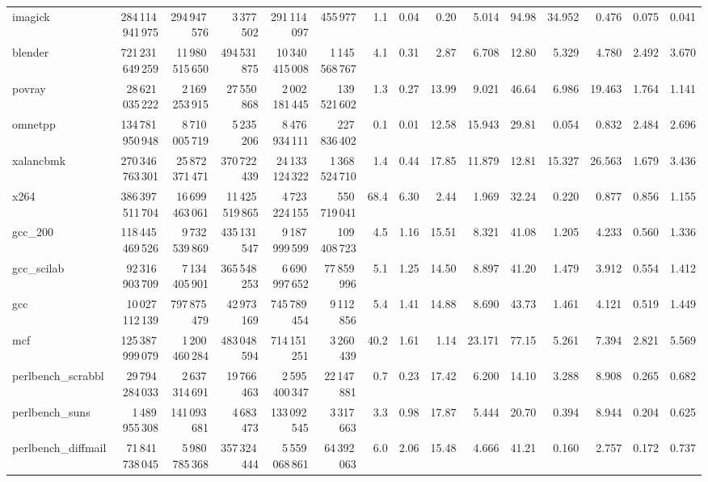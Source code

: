 \documentclass[9pt,landscape,a4paper]{article}
\begin{document}
\begin{adjustbox}{max width=\textwidth, max totalheight=0.50\textheight}
\begin{tabular}{lrrrrrrrrrrrrrr}
imagick & 284\,114\,941\,975 & 294\,947\,576 & 3\,377\,502 & 291\,114\,097 & 455\,977 & 1.1 & 0.04 & 0.20 & 5.014 & 94.98 & 34.952 & 0.476 & 0.075 & 0.041 \\
blender & 721\,231\,649\,259 & 11\,980\,515\,650 & 494\,531\,875 & 10\,340\,415\,008 & 1\,145\,568\,767 & 4.1 & 0.31 & 2.87 & 6.708 & 12.80 & 5.329 & 4.780 & 2.492 & 3.670 \\
povray & 28\,621\,035\,222 & 2\,169\,253\,915 & 27\,550\,868 & 2\,002\,181\,445 & 139\,521\,602 & 1.3 & 0.27 & 13.99 & 9.021 & 46.64 & 6.986 & 19.463 & 1.764 & 1.141 \\
omnetpp & 134\,781\,950\,948 & 8\,710\,005\,719 & 5\,235\,206 & 8\,476\,934\,111 & 227\,836\,402 & 0.1 & 0.01 & 12.58 & 15.943 & 29.81 & 0.054 & 0.832 & 2.484 & 2.696 \\
xalancbmk & 270\,346\,763\,301 & 25\,872\,371\,471 & 370\,722\,439 & 24\,133\,124\,322 & 1\,368\,524\,710 & 1.4 & 0.44 & 17.85 & 11.879 & 12.81 & 15.327 & 26.563 & 1.679 & 3.436 \\
x264 & 386\,397\,511\,704 & 16\,699\,463\,061 & 11\,425\,519\,865 & 4\,723\,224\,155 & 550\,719\,041 & 68.4 & 6.30 & 2.44 & 1.969 & 32.24 & 0.220 & 0.877 & 0.856 & 1.155 \\
gcc\_200 & 118\,445\,469\,526 & 9\,732\,539\,869 & 435\,131\,547 & 9\,187\,999\,599 & 109\,408\,723 & 4.5 & 1.16 & 15.51 & 8.321 & 41.08 & 1.205 & 4.233 & 0.560 & 1.336 \\
gcc\_scilab & 92\,316\,903\,709 & 7\,134\,405\,901 & 365\,548\,253 & 6\,690\,997\,652 & 77\,859\,996 & 5.1 & 1.25 & 14.50 & 8.897 & 41.20 & 1.479 & 3.912 & 0.554 & 1.412 \\
gcc & 10\,027\,112\,139 & 797\,875\,479 & 42\,973\,169 & 745\,789\,454 & 9\,112\,856 & 5.4 & 1.41 & 14.88 & 8.690 & 43.73 & 1.461 & 4.121 & 0.519 & 1.449 \\
mcf & 125\,387\,999\,079 & 1\,200\,460\,284 & 483\,048\,594 & 714\,151\,251 & 3\,260\,439 & 40.2 & 1.61 & 1.14 & 23.171 & 77.15 & 5.261 & 7.394 & 2.821 & 5.569 \\
perlbench\_scrabbl & 29\,794\,284\,033 & 2\,637\,314\,691 & 19\,766\,463 & 2\,595\,400\,347 & 22\,147\,881 & 0.7 & 0.23 & 17.42 & 6.200 & 14.10 & 3.288 & 8.908 & 0.265 & 0.682 \\
perlbench\_suns & 1\,489\,955\,308 & 141\,093\,681 & 4\,683\,473 & 133\,092\,545 & 3\,317\,663 & 3.3 & 0.98 & 17.87 & 5.444 & 20.70 & 0.394 & 8.944 & 0.204 & 0.625 \\
perlbench\_diffmail & 71\,841\,738\,045 & 5\,980\,785\,368 & 357\,324\,444 & 5\,559\,068\,861 & 64\,392\,063 & 6.0 & 2.06 & 15.48 & 4.666 & 41.21 & 0.160 & 2.757 & 0.172 & 0.737 \\

\end{tabular}
\end{adjustbox}
\end{document}
